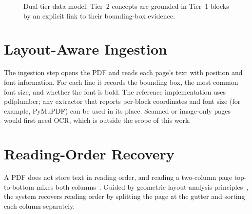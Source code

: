 \documentclass[12pt,a4paper]{report}
\begin{document}
\begin{figure}[!htbp]
\centering
{}
\caption{Dual-tier data model. Tier~2 concepts are grounded in Tier~1 blocks by an
explicit link to their bounding-box evidence.}
\label{fig:dualtier}
\end{figure}

\section{Layout-Aware Ingestion}
The ingestion step opens the PDF and reads each page's text with position and font
information. For each line it records the bounding box, the most common font size, and
whether the font is bold. The reference implementation uses pdfplumber; any extractor
that reports per-block coordinates and font size (for example, PyMuPDF) can be used in
its place. Scanned or image-only pages would first need OCR, which is outside the scope
of this work.

\section{Reading-Order Recovery}
A PDF does not store text in reading order, and reading a two-column page top-to-bottom
mixes both columns~\cite{huang2022layoutlmv3}. Guided by geometric layout-analysis
principles~\cite{ogorman1993document,breuel2002high}, the system recovers reading order
by splitting the page at the gutter and sorting each column separately.
\end{document}
